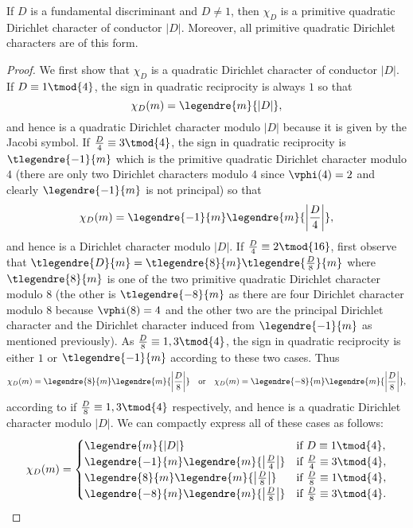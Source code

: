       \begin{theorem}\label{thm:fundamental_discriminant_character_primitive}
        If $D$ is a fundamental discriminant and $D \neq 1$, then $\chi_{D}$ is a primitive quadratic Dirichlet character of conductor $|D|$. Moreover, all primitive quadratic Dirichlet characters are of this form.
      \end{theorem}
      \begin{proof}
        We first show that $\chi_{D}$ is a quadratic Dirichlet character of conductor $|D|$. If $D \equiv 1 \tmod{4}$, the sign in quadratic reciprocity is always $1$ so that
        \[
          \chi_{D}(m) = \legendre{m}{|D|},
        \]
        and hence is a quadratic Dirichlet character modulo $|D|$ because it is given by the Jacobi symbol. If $\frac{D}{4} \equiv 3 \tmod{4}$, the sign in quadratic reciprocity is $\tlegendre{-1}{m}$ which is the primitive quadratic Dirichlet character modulo $4$ (there are only two Dirichlet characters modulo $4$ since $\vphi(4) = 2$ and clearly $\legendre{-1}{m}$ is not principal) so that
        \[
          \chi_{D}(m) = \legendre{-1}{m}\legendre{m}{\left|\frac{D}{4}\right|},
        \]
        and hence is a Dirichlet character modulo $|D|$. If $\frac{D}{4} \equiv 2 \tmod{16}$, first observe that $\tlegendre{D}{m} = \tlegendre{8}{m}\tlegendre{\frac{D}{8}}{m}$ where $\tlegendre{8}{m}$ is one of the two primitive quadratic Dirichlet character modulo $8$ (the other is $\tlegendre{-8}{m}$ as there are four Dirichlet character modulo $8$ because $\vphi(8) = 4$ and the other two are the principal Dirichlet character and the Dirichlet character induced from $\legendre{-1}{m}$ as mentioned previously). As $\frac{D}{8} \equiv 1,3 \tmod{4}$, the sign in quadratic reciprocity is either $1$ or $\tlegendre{-1}{m}$ according to these two cases. Thus
        \[
          \chi_{D}(m) = \legendre{8}{m}\legendre{m}{\left|\frac{D}{8}\right|} \quad \text{or} \quad \chi_{D}(m) = \legendre{-8}{m}\legendre{m}{\left|\frac{D}{8}\right|},
        \]
        according to if $\frac{D}{8} \equiv 1,3 \tmod{4}$ respectively, and hence is a quadratic Dirichlet character modulo $|D|$. We can compactly express all of these cases as follows:
        \[
          \chi_{D}(m) = \begin{cases} \legendre{m}{|D|} & \text{if $D \equiv 1 \tmod{4}$}, \\ \legendre{-1}{m}\legendre{m}{\left|\frac{D}{4}\right|} & \text{if $\frac{D}{4} \equiv 3 \tmod{4}$}, \\ \legendre{8}{m}\legendre{m}{\left|\frac{D}{8}\right|} & \text{if $\frac{D}{8} \equiv 1 \tmod{4}$}, \\ \legendre{-8}{m}\legendre{m}{\left|\frac{D}{8}\right|} & \text{if $\frac{D}{8} \equiv 3 \tmod{4}$}. \end{cases}
\]
\end{proof}

